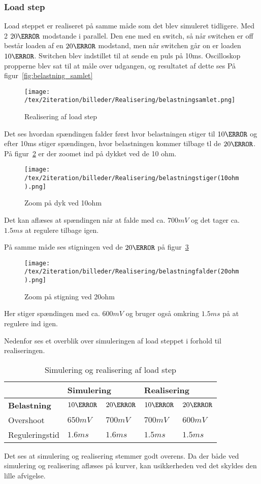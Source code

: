 \subsubsection{Load step}
Load steppet er realiseret på samme måde som det blev simuleret tidligere. Med 2 $20\ohm$ modstande i parallel. Den ene med en switch, så når switchen er off består loaden af en $20\ohm$ modstand, men når switchen går on er loaden $10\ohm$. Switchen blev indstillet til at sende en puls på 10ms. Oscilloskop propperne blev sat til at måle over udgangen, og resultatet af dette ses På figur~\ref{fig:belastning_samlet} 
\begin{figure}[H]
	\center
	\texttt{[image: /tex/2iteration/billeder/Realisering/belastningsamlet.png]}
	\caption{Realisering af load step}
	\label{fig:belastningsamlet}
\end{figure}
Det ses hvordan spændingen falder først hvor belastningen stiger til $10\ohm$ og efter 10ms stiger spændingen, hvor belastningen kommer tilbage tl de $20\ohm$. På figur~\ref{fig:belastning_10ohm} er der zoomet ind på dykket ved de 10 ohm. 
\begin{figure}[H]
	\center
	\texttt{[image: /tex/2iteration/billeder/Realisering/belastningstiger(10ohm).png]}
	\caption{Zoom på dyk ved 10ohm}
	\label{fig:belastning_10ohm}
\end{figure}
Det kan aflæses at spændingen når at falde med ca. $700mV$ og det tager ca. $1.5ms$ at regulere tilbage igen.

På samme måde ses stigningen ved de $20\ohm$ på figur~\ref{fig:belastning_20ohm}
\begin{figure}[H]
	\center
	\texttt{[image: /tex/2iteration/billeder/Realisering/belastningfalder(20ohm).png]}
	\caption{Zoom på stigning ved 20ohm}
	\label{fig:belastning_20ohm}
\end{figure}
Her stiger spændingen med ca. $600mV$ og bruger også omkring $1.5ms$ på at regulere ind igen. 

Nedenfor ses et overblik over simuleringen af load steppet i forhold til realiseringen. 

\begin{table}[H] 			
	\centering
	\begin{tabularx}{\textwidth}{|X|l|l|l|l|}
		\hline
		& \multicolumn{2}{|l|}{\textbf{Simulering}} & \multicolumn{2}{|l|}{\textbf{Realisering}} \\ \hline
		\textbf{Belastning} & $10\ohm$ & $20\ohm$ & $10\ohm$ & $20\ohm$ \\ \hline
		Overshoot & $650mV$ & $700mV$ & $700mV$ & $600mV$  \\ \hline
		Reguleringstid & $1.6ms$ & $1.6ms$ & $1.5ms$ & $1.5ms$ \\ \hline
	\end{tabularx}
	\caption{Simulering og realisering af load step}
	\label{tab:Loadstep}
\end{table}
Det ses at simulering og realisering stemmer godt overens. Da der både ved simulering og realisering aflæses på kurver, kan usikkerheden ved det skyldes den lille afvigelse.

